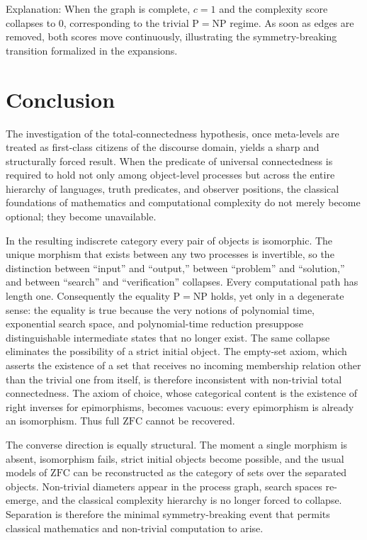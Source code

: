 \documentclass[11pt,a4paper]{article}
\theoremstyle{definition}
\begin{document}
Explanation: When the graph is complete, \(c=1\) and the complexity score collapses to 0, corresponding to the trivial \(\mathrm{P}=\mathrm{NP}\) regime. As soon as edges are removed, both scores move continuously, illustrating the symmetry-breaking transition formalized in the expansions.



\newpage
\section*{Conclusion}

The investigation of the total-connectedness hypothesis, once meta-levels are treated as first-class citizens of the discourse domain, yields a sharp and structurally forced result. When the predicate of universal connectedness is required to hold not only among object-level processes but across the entire hierarchy of languages, truth predicates, and observer positions, the classical foundations of mathematics and computational complexity do not merely become optional; they become unavailable.

In the resulting indiscrete category every pair of objects is isomorphic. The unique morphism that exists between any two processes is invertible, so the distinction between “input” and “output,” between “problem” and “solution,” and between “search” and “verification” collapses. Every computational path has length one. Consequently the equality \(\mathrm{P}=\mathrm{NP}\) holds, yet only in a degenerate sense: the equality is true because the very notions of polynomial time, exponential search space, and polynomial-time reduction presuppose distinguishable intermediate states that no longer exist. The same collapse eliminates the possibility of a strict initial object. The empty-set axiom, which asserts the existence of a set that receives no incoming membership relation other than the trivial one from itself, is therefore inconsistent with non-trivial total connectedness. The axiom of choice, whose categorical content is the existence of right inverses for epimorphisms, becomes vacuous: every epimorphism is already an isomorphism. Thus full \(\mathrm{ZFC}\) cannot be recovered.

The converse direction is equally structural. The moment a single morphism is absent, isomorphism fails, strict initial objects become possible, and the usual models of \(\mathrm{ZFC}\) can be reconstructed as the category of sets over the separated objects. Non-trivial diameters appear in the process graph, search spaces re-emerge, and the classical complexity hierarchy is no longer forced to collapse. Separation is therefore the minimal symmetry-breaking event that permits classical mathematics and non-trivial computation to arise.
\end{document}
